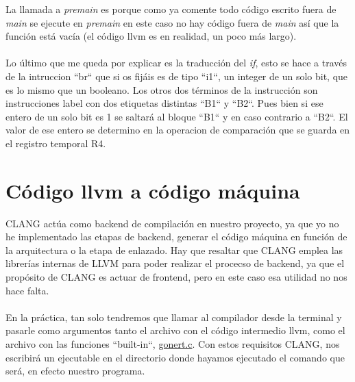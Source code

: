 La llamada a \textit{premain} es porque como ya comente todo código escrito fuera de \textit{main} se ejecute en \textit{premain} en este caso no hay código fuera de \textit{main} así que la función está vacía (el código llvm es en realidad, un poco más largo). \\\\
Lo último que me queda por explicar es la traducción del \textit{if}, esto se hace a través de la intruccion ``br`` que si os fijáis es de tipo ``i1``, un integer de un solo bit, que es lo mismo que un booleano. Los otros dos términos de la instrucción son instrucciones label con dos etiquetas distintas ``B1`` y ``B2``. Pues bien si ese entero de un solo bit es 1 se saltará al bloque ``B1`` y en caso contrario a ``B2``. El valor de ese entero se determino en la operacion de comparación que se guarda en el registro temporal R4.

\section{Código llvm a código máquina}
CLANG actúa como backend de compilación en nuestro proyecto, ya que yo no he implementado las etapas de backend, generar el código máquina en función de la arquitectura o la etapa de enlazado. Hay que resaltar que CLANG emplea las librerías internas de LLVM para poder realizar el procecso de backend, ya que el propósito de CLANG es actuar de frontend, pero en este caso esa utilidad no nos hace falta. \\\\
En la práctica, tan solo tendremos que llamar al compilador desde la terminal y pasarle como argumentos tanto el archivo con el código intermedio llvm, como el archivo con las funciones ``built-in``, \href{https://github.com/domingoUnican/TFGPedroCastro/blob/main/code/compilerGoneFSR/gone/gonert.c}{gonert.c}. Con estos requisitos CLANG, nos escribirá un ejecutable en el directorio donde hayamos ejecutado el comando que será, en efecto nuestro programa.
